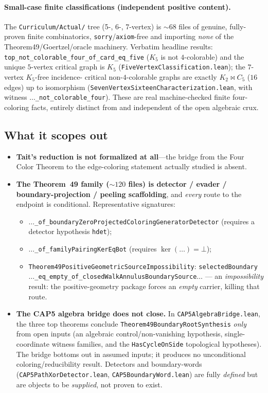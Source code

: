 \paragraph{Small-case finite classifications (independent positive content).}
The \texttt{Curriculum/Actual/} tree (5-, 6-, 7-vertex) is $\sim 68$ files of
genuine, fully-proven finite combinatorics, \texttt{sorry}/\texttt{axiom}-free
and importing \emph{none} of the Theorem49/Goertzel/oracle machinery. Verbatim
headline results: \texttt{top\_not\_colorable\_four\_of\_card\_eq\_five} ($K_5$
is not $4$-colorable) and the unique $5$-vertex critical graph is $K_5$
(\texttt{FiveVertexClassification.lean}); the $7$-vertex $K_5$-free incidence-
critical non-$4$-colorable graphs are exactly $K_2\bowtie C_5$ ($16$ edges) up to
isomorphism (\texttt{SevenVertexSixteenCharacterization.lean}, with witness
\texttt{$\dots$\_not\_colorable\_four}). These are real machine-checked
finite four-coloring facts, entirely distinct from and independent of the open
algebraic crux.

\subsection{What it scopes out}
\label{sec:fc-scopes}

\begin{itemize}
  \item \textbf{Tait's reduction is not formalized at all}---the bridge from the
  Four Color Theorem to the edge-coloring statement actually studied is absent.
  \item \textbf{The Theorem~49 family ($\sim 120$ files) is detector / evader /
  boundary-projection / peeling scaffolding}, and \emph{every} route to the
  endpoint is conditional. Representative signatures: 
  \begin{itemize}
    \item \texttt{$\dots$\_of\_boundaryZeroProjectedColoringGeneratorDetector}
    (requires a detector hypothesis \texttt{hdet});
    \item \texttt{$\dots$\_of\_familyPairingKerEqBot}
    (requires $\ker(\dots)=\bot$);
    \item \texttt{Theorem49PositiveGeometricSourceImpossibility}:
    \texttt{selectedBoundary$\dots$\_eq\_empty\_of\_closedWalkAnnulusBoundarySource$\dots$}
    --- an \emph{impossibility} result: the positive-geometry package forces an
    \emph{empty} carrier, killing that route.
  \end{itemize}
  \item \textbf{The CAP5 algebra bridge does not close.} In
  \texttt{CAP5AlgebraBridge.lean}, the three top theorems conclude
  \texttt{Theorem49BoundaryRootSynthesis} \emph{only} from open inputs (an
  algebraic control/non-vanishing hypothesis, single-coordinate witness families,
  and the \texttt{HasCycleOnSide} topological hypotheses). The bridge bottoms out
  in assumed inputs; it produces no unconditional coloring/reducibility result.
  Detectors and boundary-words (\texttt{CAP5PathXorDetector.lean},
  \texttt{CAP5BoundaryWord.lean}) are fully \emph{defined} but are objects to be
  \emph{supplied}, not proven to exist.
\end{itemize}

